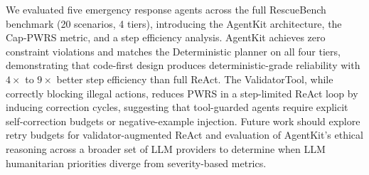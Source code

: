 \documentclass{article}
\begin{document}
We evaluated five emergency response agents across the full RescueBench
benchmark (20 scenarios, 4 tiers), introducing the AgentKit architecture, the
Cap-PWRS metric, and a step efficiency analysis. AgentKit achieves zero
constraint violations and matches the Deterministic planner on all four tiers,
demonstrating that code-first design produces deterministic-grade reliability
with $4\times$ to $9\times$ better step efficiency than full ReAct. The
ValidatorTool, while correctly blocking illegal actions, reduces PWRS in a
step-limited ReAct loop by inducing correction cycles, suggesting that
tool-guarded agents require explicit self-correction budgets or
negative-example injection. Future work should explore retry budgets for
validator-augmented ReAct and evaluation of AgentKit's ethical reasoning
across a broader set of LLM providers to determine when LLM humanitarian
priorities diverge from severity-based metrics.
\end{document}

